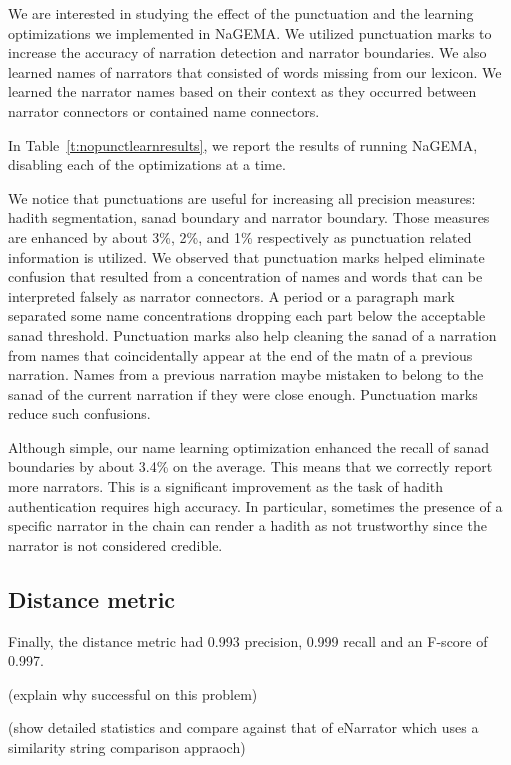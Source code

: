 \documentclass{llncs}
\begin{document}
We are interested in studying the effect of the punctuation 
and the learning optimizations we implemented in NaGEMA.
We utilized punctuation marks to increase the accuracy of narration detection and narrator boundaries. 
We also learned names of narrators that consisted of words missing from 
our lexicon.
We learned the narrator names based on their context as they occurred 
between narrator connectors or contained name connectors. 

In Table~\ref{t:nopunctlearnresults}, we report the results of running NaGEMA, 
disabling each of the optimizations at a time.

We notice that punctuations are useful for increasing all precision measures: hadith segmentation, sanad boundary and
narrator boundary. Those measures are enhanced by about 
3\%, 2\%, and 1\% respectively as punctuation related 
information is utilized.  
We observed that punctuation marks helped eliminate confusion that resulted from a 
concentration of names and words that 
can be interpreted falsely as narrator connectors. 
A period or a paragraph mark separated some name concentrations 
dropping each part below the acceptable sanad threshold. 
Punctuation marks also help cleaning the sanad of a narration from 
names that coincidentally appear at the 
end of the matn of a previous narration. 
Names from a previous narration maybe mistaken to belong to the sanad of the current 
narration if they were close enough. 
Punctuation marks reduce such confusions.


Although simple, our name learning optimization enhanced the recall 
of sanad boundaries by about 3.4\% on the average.
This means that we correctly report more narrators.
This is a significant improvement as the task of hadith authentication requires high accuracy. 
In particular, sometimes the presence of a specific narrator in the chain can render a 
hadith as not trustworthy since the narrator is not considered credible.

\subsection{Distance metric}
Finally, the distance metric had 0.993 precision,
0.999 recall and an F-score of 0.997.

(explain why successful on this problem)

(show detailed statistics and compare against that of eNarrator which uses a similarity string comparison appraoch)
\end{document}

